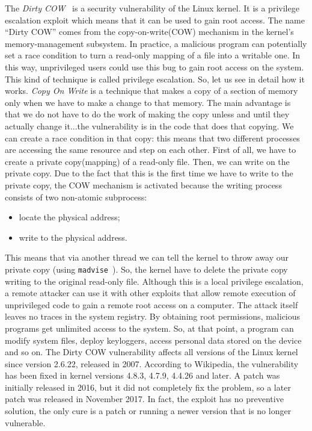 \documentclass{masterthesis}
\begin{document}
The \emph{Dirty COW}~\cite{alam2017study} is a security vulnerability of the Linux kernel. It is a privilege escalation exploit which means that it can be used to gain root access.
The name ``Dirty COW'' comes from the copy-on-write(COW) mechanism in the kernel's memory-management subsystem. 
In practice, a malicious program can potentially set a race condition to turn a read-only mapping of a file into a writable one. In this way, unprivileged users could use this bug to gain root access on the system. This kind of technique is called privilege escalation.
So, let us see in detail how it works.
\emph{Copy On Write} is a technique that makes a copy of a section of memory only when we have to make a change to that memory. The main advantage is that we do not have to do the work of making the copy unless and until they actually change it...the vulnerability is in the code that does that copying. We can create a race condition in that copy: this means that two different processes are accessing the same resource and step on each other. 
First of all, we have to create a private copy(mapping) of a read-only file. Then, we can write on the private copy. Due to the fact that this is the first time we have to write to the private copy, the COW mechanism is activated because the writing process consists of two non-atomic subprocess:
\begin{itemize}
\item locate the physical address;
\item write to the physical address.
\end{itemize}
This means that via another thread we can tell the kernel to throw away our private copy (using \texttt{madvise}~\cite{madvise}). So, the kernel have to delete the private copy writing to the original read-only file.
Although this is a local privilege escalation, a remote attacker can use it with other exploits that allow remote execution of unprivileged code to gain a remote root access on a computer. The attack itself leaves no traces in the system registry.
By obtaining root permissions, malicious programs get unlimited access to the system.
So, at that point, a program can modify system files, deploy keyloggers, access personal data stored on the device and so on.
The Dirty COW vulnerability affects all versions of the Linux kernel since version 2.6.22, released in 2007. According to Wikipedia, the vulnerability has been fixed in kernel versions 4.8.3, 4.7.9, 4.4.26 and later. 
A patch was initially released in 2016, but it did not completely fix the problem, so a later patch was released in November 2017. In fact, the exploit has no preventive solution, the only cure is a patch or running a newer version that is no longer vulnerable.
\end{document}
